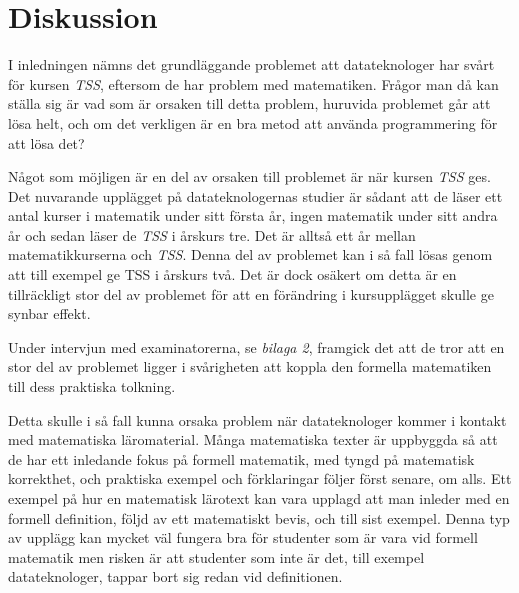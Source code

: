 \documentclass[]{article}
\begin{document}
\section{Diskussion}




I inledningen nämns det grundläggande problemet att datateknologer har svårt för kursen \textit{TSS}, eftersom de har problem
med matematiken. Frågor man då kan ställa sig är vad som är orsaken till detta problem, huruvida problemet går att lösa
helt, och om det verkligen är en bra metod att använda programmering för att lösa det?

Något som möjligen är en del av orsaken till problemet är när kursen \textit{TSS} ges. Det nuvarande upplägget på
datateknologernas studier är sådant att de läser ett antal kurser i matematik under sitt första år, ingen matematik
under sitt andra år och sedan läser de \textit{TSS} i årskurs tre. Det är alltså ett år mellan matematikkurserna och
\textit{TSS}. Denna del av problemet kan i så fall lösas genom att till exempel ge TSS i årskurs två. Det är dock
osäkert om detta är en tillräckligt stor del av problemet för att en förändring i kursupplägget skulle ge synbar effekt.

Under intervjun med examinatorerna, se \textit{bilaga 2}, framgick det att de tror att en stor del av problemet ligger i
svårigheten att koppla den formella matematiken till dess praktiska tolkning.

Detta skulle i så fall kunna orsaka problem när datateknologer kommer i kontakt med matematiska läromaterial. Många
matematiska texter är uppbyggda så att de har ett inledande fokus på formell matematik, med tyngd på matematisk
korrekthet, och praktiska exempel och förklaringar följer först senare, om alls. Ett exempel på hur en matematisk
lärotext kan vara upplagd att man inleder med en formell definition, följd av ett matematiskt bevis, och till sist
exempel. Denna typ av upplägg kan mycket väl fungera bra för studenter som är vara vid formell matematik men risken är
att studenter som inte är det, till exempel datateknologer, tappar bort sig redan vid definitionen.
\end{document}
